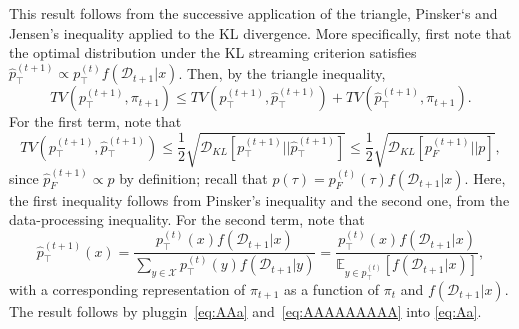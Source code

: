 \documentclass{article}
\theoremstyle{plain}
\theoremstyle{definition}
\theoremstyle{remark}
\theoremstyle{remark}
\begin{document}
This result follows from the successive application of the triangle, Pinsker`s \cite{csiszar2011information} and Jensen's inequality applied to the KL divergence. More specifically, first note that the optimal distribution under the KL streaming criterion satisfies $\hat{p}_{\top}^{(t + 1)} \propto p_{\top}^{(t)} f(\mathcal{D}_{t + 1} | x)$. Then, by the triangle inequality, 
\begin{equation} \label{eq:Aa} 
     TV\left(p_{\top}^{(t + 1)}, \pi_{t + 1}\right) \le  TV\left(p_{\top}^{(t + 1)}, \hat{p}_{\top}^{(t +1)} \right) +  TV\left(\hat{p}_{\top}^{(t + 1)}, \pi_{t + 1}\right).    
\end{equation}
For the first term, note that 
\begin{equation} \label{eq:AAAAAAAAA} 
    TV\left(p_{\top}^{(t + 1)}, \hat{p}_{\top}^{(t +1)} \right) \le \frac{1}{2} \sqrt{ \mathcal{D}_{KL}\left[p_{\top}^{(t + 1)} || \hat{p}_{\top}^{(t +1)} \right]} \le \frac{1}{2} \sqrt{\mathcal{D}_{KL} \left[ p_{F}^{(t + 1)} || p\right]}, 
\end{equation}
since $\hat{p}_{F}^{(t + 1)} \propto p$ by definition; recall that $p(\tau) = p_{F}^{(t)}(\tau) f(\mathcal{D}_{t +  1} |x)$. Here, the first inequality follows from Pinsker's inequality and the second one, from the data-processing inequality. For the second term, note that 
\begin{equation} \label{eq:AAa} 
    \hat{p}_{\top}^{(t + 1)}(x) = \frac{p_{\top}^{(t)}(x) f(\mathcal{D}_{t + 1} | x)}{\sum_{y \in \mathcal{X}} p_{\top}^{(t)}(y) f(\mathcal{D}_{t + 1} | y)} = \frac{p_{\top}^{(t)}(x) f(\mathcal{D}_{t + 1} | x)}{\mathbb{E}_{y \in p_{\top}^{(t)}} \left[ f(\mathcal{D}_{t + 1} | x) \right]}, %
\end{equation}
with a corresponding representation of $\pi_{t + 1}$ as a function of $\pi_{t}$ and $f(\mathcal{D}_{t + 1} | x)$. The result follows by pluggin~\autoref{eq:AAa} and~\autoref{eq:AAAAAAAAA} into \autoref{eq:Aa}. 


\end{document}
